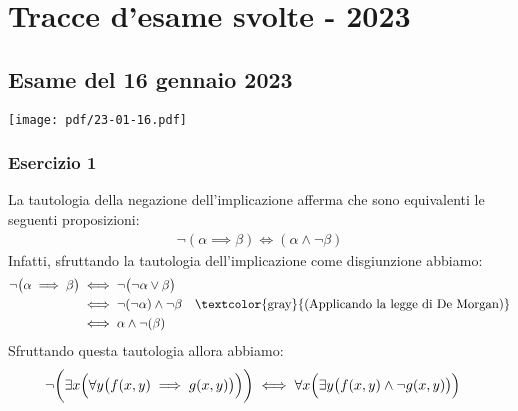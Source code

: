 \chapter{Tracce d'esame svolte - 2023}

\section{Esame del 16 gennaio 2023}
\begin{center}
	\texttt{[image: pdf/23-01-16.pdf]}
\end{center}
\subsection*{Esercizio 1}
La tautologia della negazione dell'implicazione afferma che sono equivalenti le seguenti proposizioni:
\begin{align*}
	\neg(\alpha \implies \beta) \iff (\alpha \land \neg \beta)
\end{align*}
Infatti, sfruttando la tautologia dell'implicazione come disgiunzione abbiamo:
\begin{align*}
	\neg \bigl(\alpha \implies \beta \bigr) &\iff \neg \bigl( \neg \alpha \lor \beta \bigr) \\
	&\iff \neg (\neg \alpha) \land \neg \beta & \text{\textcolor{gray}{(Applicando la legge di De Morgan)}} \\
	&\iff \alpha \land \neg(\beta)
\end{align*}
Sfruttando questa tautologia allora abbiamo:
\begin{align*}
	\neg \biggl(\exists x \Bigl(\forall y \bigl( f(x,y) \implies g(x,y) \bigr)\Bigr)\biggr) &\iff \forall x \Bigl( \exists y \bigl( f(x,y) \land \neg g(x,y) \bigr)\Bigr)
\end{align*}
